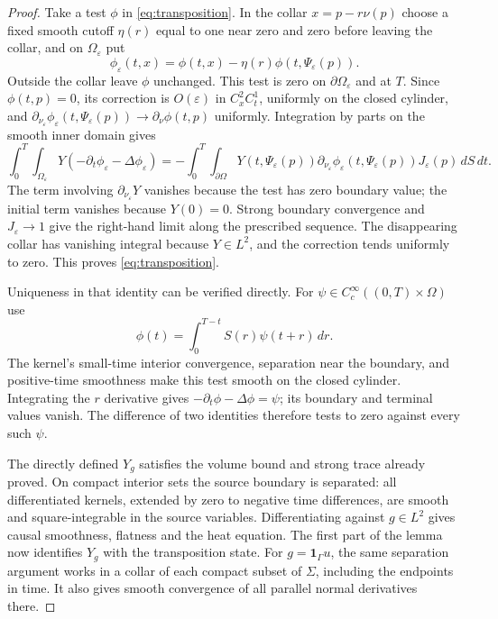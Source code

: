\documentclass[11pt]{article}
\theoremstyle{remark}
\newcommand{\Om}{\Omega}
\newcommand{\dt}{\partial_t}
\newcommand{\dn}{\partial_\nu}
\begin{document}
\begin{proof}
Take a test $\phi$ in \eqref{eq:transposition}.
In the collar $x=p-r\nu(p)$ choose a fixed smooth cutoff $\eta(r)$
equal to one near zero and zero before leaving the collar, and on
$\Om_\varepsilon$ put
\[
 \phi_\varepsilon(t,x)=
        \phi(t,x)-\eta(r)\phi(t,\Psi_\varepsilon(p)).
\]
Outside the collar leave $\phi$ unchanged.
This test is zero on $\partial\Om_\varepsilon$ and at $T$.
Since $\phi(t,p)=0$, its correction is $O(\varepsilon)$ in
$C_x^2C_t^1$, uniformly on the closed cylinder, and
$\partial_{\nu_\varepsilon}\phi_\varepsilon(t,\Psi_\varepsilon(p))
\to\dn\phi(t,p)$ uniformly.
Integration by parts on the smooth inner domain gives
\[
 \int_0^T\int_{\Om_\varepsilon}
       Y(-\dt\phi_\varepsilon-\Delta\phi_\varepsilon)
  =-\int_0^T\int_{\partial\Om}
       Y(t,\Psi_\varepsilon(p))
       \partial_{\nu_\varepsilon}\phi_\varepsilon(t,\Psi_\varepsilon(p))
       J_\varepsilon(p)\,dS\,dt .
\]
The term involving $\partial_{\nu_\varepsilon}Y$ vanishes because the test
has zero boundary value; the initial term vanishes because $Y(0)=0$.
Strong boundary convergence and $J_\varepsilon\to1$ give the right-hand
limit along the prescribed sequence.
The disappearing collar has vanishing integral because $Y\in L^2$,
and the correction tends uniformly to zero.
This proves \eqref{eq:transposition}.

Uniqueness in that identity can be verified directly.
For $\psi\in C^\infty_c((0,T)\times\Om)$ use
\[
 \phi(t)=\int_0^{T-t}S(r)\psi(t+r)\,dr.
\]
The kernel's small-time interior convergence, separation near the boundary,
and positive-time smoothness make this test smooth on the closed cylinder.
Integrating the $r$ derivative gives $-\dt\phi-\Delta\phi=\psi$;
its boundary and terminal values vanish.
The difference of two identities therefore tests to zero against every
such $\psi$.

The directly defined $Y_g$ satisfies the volume bound and strong trace
already proved. On compact interior sets the source boundary is separated:
all differentiated kernels, extended by zero to negative time differences,
are smooth and square-integrable in the source variables.
Differentiating against $g\in L^2$ gives causal smoothness, flatness and
the heat equation. The first part of the lemma now identifies $Y_g$ with
the transposition state.
For $g=\mathbf1_\Gamma u$, the same separation argument works in a collar
of each compact subset of $\Sigma$, including the endpoints in time.
It also gives smooth convergence of all parallel normal derivatives there.
\end{proof}
\end{document}
